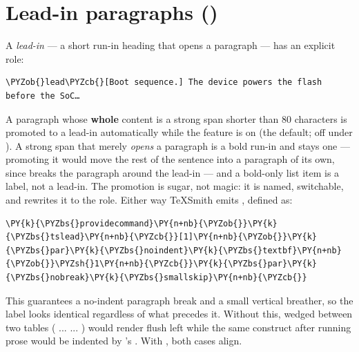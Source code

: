 \documentclass[a4paper,twoside]{article}
\begin{document}
\section{Lead-in paragraphs ()}
A \emph{lead-in} --- a short run-in heading that opens a paragraph --- has an explicit
role:
\begin{tscode}[lang=md, engine=pygments]
\begin{Verbatim}[commandchars=\\\{\},breaklines, breakanywhere, commandchars=\\\{\}]
\PYZob{}lead\PYZcb{}[Boot sequence.] The device powers the flash before the SoC…
\end{Verbatim}
\end{tscode}
A paragraph whose \textbf{whole} content is a strong span shorter than 80 characters
is promoted to a lead-in automatically while the  feature is on
(the default; off under ). A strong span that merely \emph{opens} a
paragraph is a bold run-in and stays one --- promoting it would move the rest of
the sentence into a paragraph of its own, since  breaks the paragraph
around the lead-in --- and a bold-only list item is a label, not a lead-in. The
promotion is sugar, not magic: it is named, switchable, and 
rewrites it to the role. Either way TeXSmith emits , defined as:
\begin{tscode}[lang=latex, engine=pygments]
\begin{Verbatim}[commandchars=\\\{\},breaklines, breakanywhere, commandchars=\\\{\}]
\PY{k}{\PYZbs{}providecommand}\PY{n+nb}{\PYZob{}}\PY{k}{\PYZbs{}tslead}\PY{n+nb}{\PYZcb{}}[1]\PY{n+nb}{\PYZob{}}\PY{k}{\PYZbs{}par}\PY{k}{\PYZbs{}noindent}\PY{k}{\PYZbs{}textbf}\PY{n+nb}{\PYZob{}}\PYZsh{}1\PY{n+nb}{\PYZcb{}}\PY{k}{\PYZbs{}par}\PY{k}{\PYZbs{}nobreak}\PY{k}{\PYZbs{}smallskip}\PY{n+nb}{\PYZcb{}}
\end{Verbatim}
\end{tscode}
This guarantees a no-indent paragraph break and a small vertical breather, so the label looks identical regardless of what precedes it. Without this,  wedged between two tables ( ...  ... ) would render flush left while the same construct after running prose would be indented by 's . With , both cases align.
\end{document}
